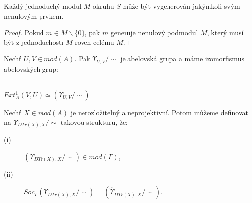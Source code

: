      \begin{lem}\label{lem-jednoduchy-modul-gen}
       Každý jednoduchý modul $M$ okruhu $S$ může být vygenerován jakýmkoli svým 
       nenulovým prvkem.
     \end{lem}
     \begin{proof}
       Pokud $m\in M\backslash\{0\}$, pak $m$ generuje nenulový podmodul $M$, 
       který musí být z jednoduchosti $M$ roven celému $M$.
     \end{proof}
     
     \begin{thm}\label{ekvivalence-upsilon-ext}
       \begin{description} \item 
         \item[(a)] Nechť $U,V \in mod(A)$. Pak $\Upsilon_{U,V}/\sim$ je 
           abelovská grupa a máme izomorfismus abelovských grup: \\\\ 
           \centerline{$Ext_A^1(V,U)\simeq (\Upsilon_{U,V}/\sim)$}
         \item[(b)] Nechť $X\in mod(A)$ je nerozložitelný a neprojektivní. Potom 
           můžeme definovat na $\Upsilon_{DTr(X),X}/\sim$ takovou strukturu, že:
           \begin{description}
             \item[(i)] $(\Upsilon_{DTr(X),X}/\sim)\in mod(\Gamma)$,
             \item[(ii)] 
             $Soc_\Gamma(\Upsilon_{DTr(X),X}/\sim)=(\hat{\Upsilon}_{DTr(X),X}/\sim)$.
           \end{description}
       \end{description}      
     \end{thm}
